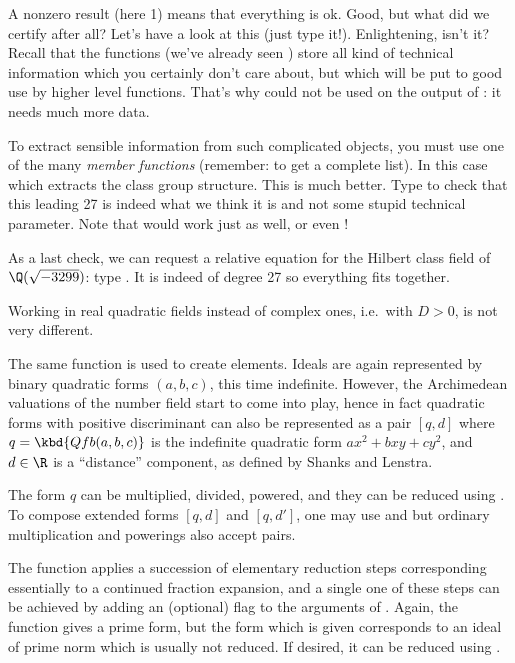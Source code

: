   A nonzero result (here 1) means that everything is ok. Good, but what did
we certify after all? Let's have a look at this  (just type it!).
Enlightening, isn't it? Recall that the  functions (we've already
seen ) store all kind of technical information which you
certainly don't care about, but which will be put to good use by higher level
functions. That's why  could not be used on the output of
: it needs much more data.

  To extract sensible information from such complicated objects, you must use
one of the many \emph{member functions} (remember:  to get a complete
list). In this case  which extracts the class group structure.
This is much better. Type  to check that this leading 27 is indeed
what we think it is and not some stupid technical parameter. Note that
 would work just as well, or even !

As a last check, we can request a relative equation for the Hilbert class
field of $\Q(\sqrt{-3299})$: type . It is indeed of
degree 27 so everything fits together.

\medskip
%
Working in real quadratic fields instead of complex ones, i.e.~with $D>0$, is
not very different.

The same  function is used to create elements. Ideals are again
represented by binary quadratic forms $(a,b,c)$, this time indefinite. However,
the Archimedean valuations of the number field start to come into play, hence
in fact quadratic forms with positive discriminant can also
be represented as a pair $[q, d]$ where $q = \kbd{Qfb(a, b, c)}$ is the
indefinite quadratic form $ax^2+bxy+cy^2$, and $d\in \R$ is a ``distance''
component, as defined by Shanks and Lenstra.

The form $q$ can be multiplied, divided, powered, and they can be
reduced using . To compose extended forms
$[q,d]$ and $[q,d']$, one may use  and  but
ordinary multiplication and powerings also accept pairs.

The  function applies a succession of
elementary reduction steps corresponding essentially to a continued fraction
expansion, and a single one of these steps can be achieved by adding an
(optional) flag to the arguments of . Again, the function
 gives a prime form, but the form which is given
corresponds to an ideal of prime norm which is usually not reduced. If
desired, it can be reduced using .

